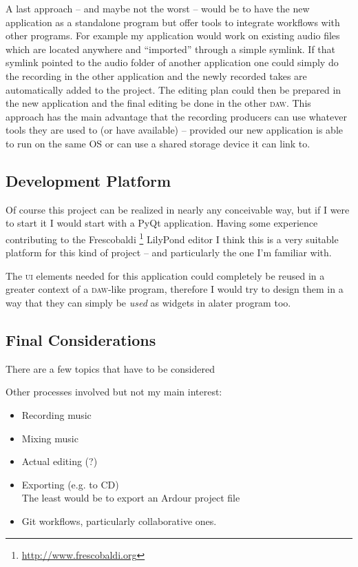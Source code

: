 \documentclass[11pt,a4paper]{article}
\begin{document}
A last approach -- and maybe not the worst -- would be to have the new application as a standalone program but offer tools to integrate workflows with other programs.
For example my application would work on existing audio files which are located anywhere and “imported” through a simple symlink.
If that symlink pointed to the audio folder of another application one could simply do the recording in the other application and the newly recorded takes are automatically added to the project.
The editing plan could then be prepared in the new application and the final editing be done in the other \textsc{daw}.
This approach has the main advantage that the recording producers can use whatever tools they are used to (or have available) -- provided our new application is able to run on the same OS or can use a shared storage device it can link to.

\subsection{Development Platform}
Of course this project can be realized in nearly any conceivable way, but if I were to start it I would start with a PyQt application.
Having some experience contributing to the Frescobaldi%
\footnote{\url{http://www.frescobaldi.org}}
LilyPond editor I think this is a very suitable platform for this kind of project -- and particularly the one I'm familiar with.

The \textsc{ui} elements needed for this application could completely be reused in a greater context of a \textsc{daw}-like program, therefore I would try to design them in a way that they can simply be \emph{used} as widgets in alater program too.

\subsection{Final Considerations}
There are a few topics that have to be considered

Other processes involved but not my main interest:

\begin{itemize}
\item Recording music
\item Mixing music
\item Actual editing (?)
\item Exporting (e.g. to CD)\\
	The least would be to export an Ardour project file
\item Git workflows, particularly collaborative ones.
\end{itemize}
\end{document}

